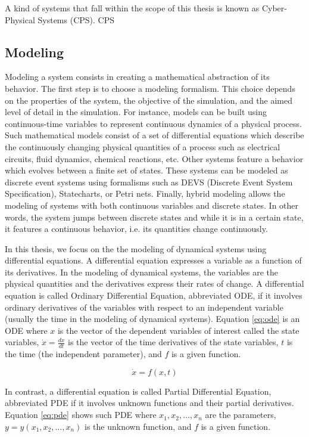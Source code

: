  A kind of systems that fall within the scope of this thesis is known as Cyber-Physical Systems (CPS). CPS

\subsection{Modeling}

Modeling a system consists in creating a mathematical abstraction of its behavior. The first step is to choose a modeling formalism. This choice depends on the properties of the system, the objective of the simulation, and the aimed level of detail in the simulation. For instance, models can be built using continuous-time variables to represent continuous dynamics of a physical process. Such mathematical models consist of a set of differential equations which describe the continuously changing physical quantities of a process such as electrical circuits, fluid dynamics, chemical reactions, etc. Other systems feature a behavior which evolves between a finite set of states. These systems can be modeled as discrete event systems using formalisms such as DEVS (Discrete Event System Specification), Statecharts, or Petri nets. Finally, hybrid modeling allows the modeling of systems with both continuous variables and discrete states. In other words, the system jumps between discrete states and while it is in a certain state, it features a continuous behavior, i.e. its quantities change continuously. 

In this thesis, we focus on the the modeling of dynamical systems using differential equations. A differential equation expresses a variable as a function of its derivatives. In the modeling of dynamical systems, the variables are the physical quantities and the derivatives express their rates of change. A differential equation is called Ordinary Differential Equation, abbreviated ODE, if it involves ordinary derivatives of the variables with respect to an independent variable (usually the time in the modeling of dynamical systems).  Equation \ref{eq:ode} is an ODE where $x$ is the vector of the dependent variables of interest called the state variables, $\dot{x} = \frac{dx}{dt}$ is the vector of the time derivatives of the state variables, $t$ is the time (the independent parameter), and $f$ is a given function.

\begin{equation}
\dot{x} = f(x,t)
\label{eq:ode}
\end{equation}

In contrast, a differential equation is called Partial Differential Equation, abbreviated PDE if it involves unknown functions and their partial derivatives. Equation \ref{eq:pde} shows such PDE where $x_1,x_2,\dots, x_n$ are the parameters, $y=y(x_1,x_2,\dots, x_n)$ is the unknown function, and $f$ is a given function.

